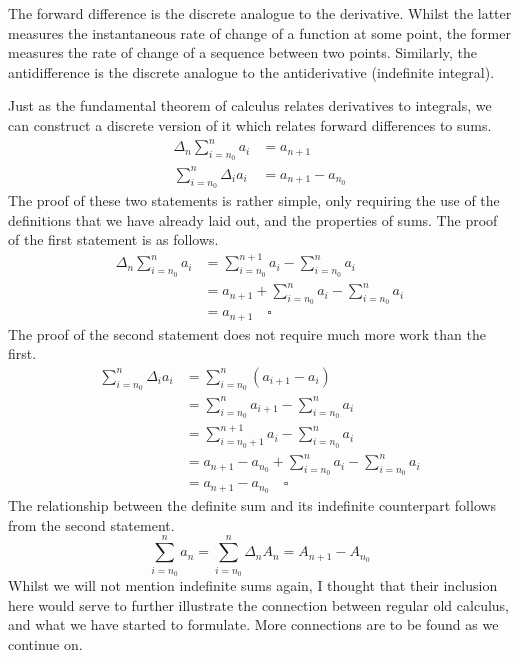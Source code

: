 \documentclass[a4paper]{article}
\theoremstyle{definition}
\begin{document}
The forward difference is the discrete analogue to the derivative.
Whilst the latter measures the instantaneous rate of change of a function at some point, the former measures the rate of change of a sequence between two points.
Similarly, the antidifference is the discrete analogue to the antiderivative (indefinite integral).

Just as the fundamental theorem of calculus relates derivatives to integrals, we can construct a discrete version of it which relates forward differences to sums.
\begin{align}
    \Delta_n \sum_{i=n_0}^{n} a_i & = a_{n+1} \label{DFTC1}           \\
    \sum_{i=n_0}^n \Delta_i a_i   & = a_{n+1} - a_{n_0} \label{DFTC2}
\end{align}
The proof of these two statements is rather simple, only requiring the use of the definitions that we have already laid out, and the properties of sums.
The proof of the first statement is as follows.
\begin{align*}
    \Delta_n \sum_{i=n_0}^{n} a_i & = \sum_{i=n_0}^{n+1} a_i - \sum_{i=n_0}^{n} a_i         \\
                                  & = a_{n+1} + \sum_{i=n_0}^{n} a_i - \sum_{i=n_0}^{n} a_i \\
                                  & = a_{n+1} \quad \square
\end{align*}
The proof of the second statement does not require much more work than the first.
\begin{align*}
    \sum_{i=n_0}^n \Delta_i a_i & = \sum_{i=n_0}^n (a_{i+1} - a_i)                                \\
                                & = \sum_{i=n_0}^n a_{i+1} - \sum_{i=n_0}^n a_i                   \\
                                & = \sum_{i=n_0+1}^{n+1} a_i - \sum_{i=n_0}^n a_i                 \\
                                & = a_{n+1} - a_{n_0} + \sum_{i=n_0}^{n} a_i - \sum_{i=n_0}^n a_i \\
                                & = a_{n+1} - a_{n_0} \quad \square
\end{align*}
The relationship between the definite sum and its indefinite counterpart follows from the second statement.
\begin{equation}
    \sum_{i=n_0}^n a_n = \sum_{i=n_0}^n \Delta_n A_n = A_{n+1} - A_{n_0}
\end{equation}
Whilst we will not mention indefinite sums again, I thought that their inclusion here would serve to further illustrate the connection between regular old calculus, and what we have started to formulate.
More connections are to be found as we continue on.
\end{document}
